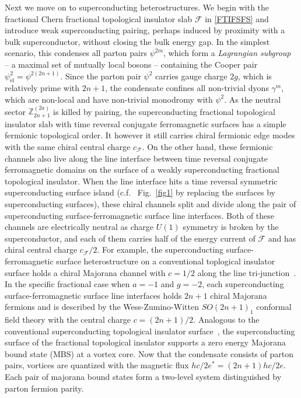 Next we move on to superconducting heterostructures. We begin with the fractional Chern fractional topological insulator slab $\mathcal{F}$ in \eqref{FTIFSFS} and introduce weak superconducting pairing, perhaps induced by proximity with a bulk superconductor, without closing the bulk energy gap. In the simplest scenario, this condenses all parton pairs $\psi^{2m}$, which form a {\em Lagrangian subgroup}~\cite{Levin13} -- a maximal set of mutually local bosons -- containing the Cooper pair $\psi_{\mathrm{el}}^2=\psi^{2(2n+1)}$. Since the parton pair $\psi^2$ carries gauge charge $2g$, which is relatively prime with $2n+1$, the condensate confines all non-trivial dyons $\gamma^m$, which are non-local and have non-trivial monodromy with $\psi^2$. As the neutral sector $\mathbb{Z}_{2n+1}^{(2a)}$ is killed by pairing, the superconducting fractional topological insulator slab with time reversal conjugate ferromagnetic surfaces has a simple fermionic topological order. It however it still carries chiral fermionic edge modes with the same chiral central charge $c_{\mathcal{F}}$. On the other hand, these fermionic channels also live along the line interface between time reversal conjugate ferromagnetic domains on the surface of a weakly superconducting fractional topological insulator. When the line interface hits a time reversal symmetric superconducting surface island (c.f.~ Fig.~\ref{fig1} by replacing the \TPf surfaces by superconducting surfaces), these chiral channels split and divide along the pair of superconducting surface-ferromagnetic surface line interfaces. Both of these channels are electrically neutral as charge $U(1)$ symmetry is broken by the superconductor, and each of them carries half of the energy current of $\mathcal{F}$ and has chiral central charge $c_{\mathcal{F}}/2$. For example, the superconducting surface-ferromagnetic surface heterostructure on a conventional toplogical insulator surface holds a chiral Majorana channel with $c=1/2$ along the line tri-junction~\cite{FuKanechargetransport09,TeoKane}. In the specific fractional case when $a=-1$ and $g=-2$, each superconducting surface-ferromagnetic surface line interfaces holds $2n+1$ chiral Majorana fermions and is described by the Wess-Zumino-Witten $SO(2n+1)_1$ conformal field theory with the central charge $c=(2n+1)/2$. Analogous to the conventional superconducting topological insulator surface~\cite{FuKane08}, the superconducting surface of the fractional topological insulator supports a zero energy Majorana bound state (\hypertarget{MBS}{MBS}) at a vortex core. Now that the condensate consists of parton pairs, vortices are quantized with the magnetic flux $hc/2e^\ast=(2n+1)hc/2e$. Each pair of majorana bound states form a two-level system distinguished by parton fermion parity.